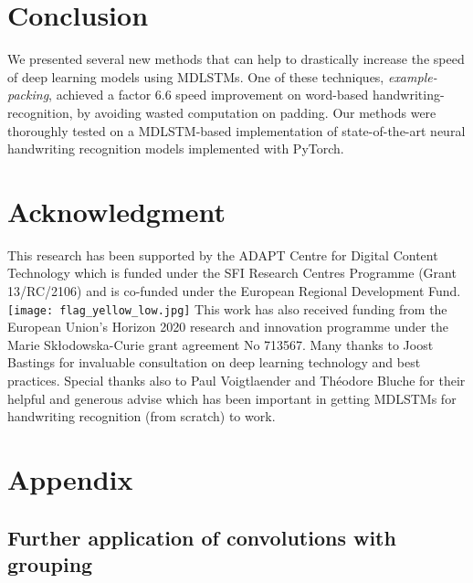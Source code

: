 \documentclass[conference]{IEEEtran}
\renewcommand{\ac}[1]{\gls{#1}}
\renewcommand{\acp}[1]{\glspl{#1}}
\begin{document}
\section{Conclusion} 

We presented several new methods that can help to drastically increase the speed of deep learning models using \acp{MDLSTM}. 
One of these techniques, \emph{example-packing}, achieved a factor 6.6 speed improvement on word-based handwriting-recognition,
by avoiding wasted computation on padding. Our methods were thoroughly tested on a \ac{MDLSTM}-based implementation of 
state-of-the-art neural handwriting recognition models implemented with PyTorch.


\section*{Acknowledgment}  


This research has been supported by the ADAPT Centre for Digital Content Technology which is funded under the SFI Research Centres Programme (Grant 13/RC/2106) and is co-funded under the European Regional Development Fund.
\noindent 
\texttt{[image: flag\_yellow\_low.jpg]}
This work has also received funding from the European Union's Horizon 2020 research and innovation programme under the Marie Sk{\l}odowska-Curie grant agreement No 713567.
Many thanks to Joost Bastings for invaluable consultation on deep learning technology and best practices. Special thanks also to Paul Voigtlaender and 
Th\'{e}odore Bluche for their helpful and generous advise which has been important in getting MDLSTMs for handwriting recognition (from scratch) to work.





\clearpage

\onecolumn


\section*{Appendix}

\subsection{Further application of convolutions with grouping}
\label{appendix:application-convolution-with-grouping}
\end{document}
